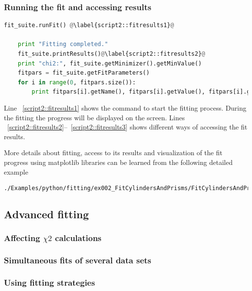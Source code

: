\subsubsection*{Running the fit and accessing results}
\begin{lstlisting}[language=python, style=eclipseboxed, firstnumber=66]
    fit_suite.runFit() @\label{script2::fitresults1}@

    print "Fitting completed."
    fit_suite.printResults()@\label{script2::fitresults2}@
    print "chi2:", fit_suite.getMinimizer().getMinValue() 
    fitpars = fit_suite.getFitParameters()
    for i in range(0, fitpars.size()):
        print fitpars[i].getName(), fitpars[i].getValue(), fitpars[i].getError() @\label{script2::fitresults3}@
\end{lstlisting}
Line ~\ref{script2::fitresults1} shows the command to start the fitting process.
During the fitting the progress will be displayed on the screen.
Lines ~\ref{script2::fitresults2}--~\ref{script2::fitresults3} shows different ways of
accessing the fit results.


More details about fitting, access to its results and visualization of
the fit progress using matplotlib libraries can be learned from the
following detailed example
\begin{lstlisting}[language=shell, style=commandline]
./Examples/python/fitting/ex002_FitCylindersAndPrisms/FitCylindersAndPrisms_detailed.py
\end{lstlisting}


\subsection {Advanced fitting} 

\subsubsection{Affecting $\chi2$ calculations}
\subsubsection{Simultaneous fits of several data sets}
\subsubsection{Using fitting strategies}
